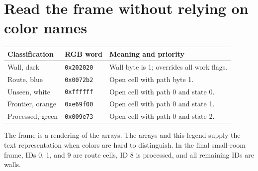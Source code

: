 \section{Read the frame without relying on color names}\label{maze-x-legend}
\begin{longtable}{@{}p{32mm}p{31mm}p{95mm}@{}}
  \toprule
  Classification   & RGB word          & Meaning and priority                      \\\midrule\endhead
  Wall, dark       & \texttt{0x202020} & Wall byte is 1; overrides all work flags. \\
  Route, blue      & \texttt{0x0072b2} & Open cell with path byte 1.               \\
  Unseen, white    & \texttt{0xffffff} & Open cell with path 0 and state 0.        \\
  Frontier, orange & \texttt{0xe69f00} & Open cell with path 0 and state 1.        \\
  Processed, green & \texttt{0x009e73} & Open cell with path 0 and state 2.        \\
  \bottomrule
\end{longtable}
The frame is a rendering of the arrays. The arrays and this legend supply the text
representation when colors are hard to distinguish. In the final small-room frame,
IDs 0, 1, and 9 are route cells, ID 8 is processed, and all remaining IDs are walls.
